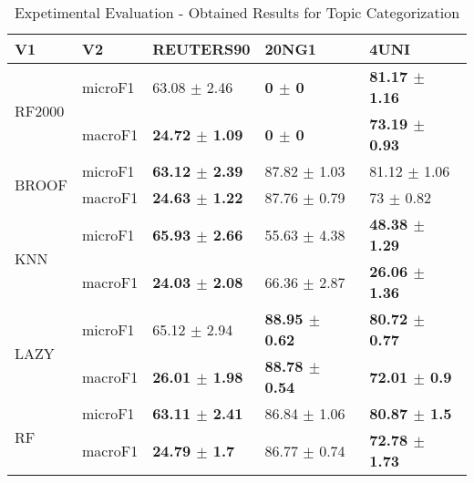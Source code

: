\documentclass[]{article}
\begin{document}
\begin{table}[ht]
\centering
\begin{tabular}{lllll}
  \hline
V1 & V2 & REUTERS90 & 20NG1 & 4UNI \\ 
  \hline
\multirow{2}{*}{RF2000} & microF1 & 63.08 $\pm$  2.46 & \bf{0 $\pm$  0} & \bf{81.17 $\pm$  1.16} \\ 
   & macroF1 & \bf{24.72 $\pm$  1.09} & \bf{0 $\pm$  0} & \bf{73.19 $\pm$  0.93} \\ 
  \multirow{2}{*}{BROOF} & microF1 & \bf{63.12 $\pm$  2.39} & 87.82 $\pm$  1.03 & 81.12 $\pm$  1.06 \\ 
   & macroF1 & \bf{24.63 $\pm$  1.22} & 87.76 $\pm$  0.79 & 73 $\pm$  0.82 \\ 
  \multirow{2}{*}{KNN} & microF1 & \bf{65.93 $\pm$  2.66} & 55.63 $\pm$  4.38 & \bf{48.38 $\pm$  1.29} \\ 
   & macroF1 & \bf{24.03 $\pm$  2.08} & 66.36 $\pm$  2.87 & \bf{26.06 $\pm$  1.36} \\ 
  \multirow{2}{*}{LAZY} & microF1 & 65.12 $\pm$  2.94 & \bf{88.95 $\pm$  0.62} & \bf{80.72 $\pm$  0.77} \\ 
   & macroF1 & \bf{26.01 $\pm$  1.98} & \bf{88.78 $\pm$  0.54} & \bf{72.01 $\pm$  0.9} \\ 
  \multirow{2}{*}{RF} & microF1 & \bf{63.11 $\pm$  2.41} & 86.84 $\pm$  1.06 & \bf{80.87 $\pm$  1.5} \\ 
   & macroF1 & \bf{24.79 $\pm$  1.7} & 86.77 $\pm$  0.74 & \bf{72.78 $\pm$  1.73} \\ 
   \hline
\end{tabular}
\caption{Expetimental Evaluation - Obtained Results for Topic Categorization} 
\end{table}
\end{document}
